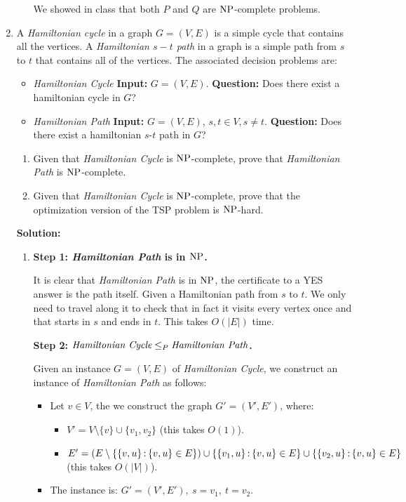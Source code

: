 \begin{enumerate}
\begin{enumerate}
	We showed in class that both $P$ and $Q$ are  $\NP$-complete problems.
	
\end{enumerate}
\newpage

\item A {\em Hamiltonian cycle} in a graph $G = (V,E)$ is a simple cycle that contains all the
vertices. A {\em Hamiltonian $s-t$ path} in a graph is a simple path from $s$ to $t$ that
contains all of the vertices. The associated decision problems are:
\begin{itemize}
	\item {\em Hamiltonian Cycle} {\bf Input:} $G=(V,E)$. {\bf Question:} Does there exist a hamiltonian cycle in $G$?
	\item  {\em Hamiltonian Path} {\bf Input:} $G=(V,E)$, $s,t\in V, s\neq t$. {\bf Question:} Does there exist a hamiltonian $s$-$t$ path in $G$?
\end{itemize}
\begin{enumerate}
	\item  Given that {\em Hamiltonian Cycle} is $\NP$-complete, prove that {\em Hamiltonian Path} is $\NP$-complete.
	\item Given that {\em Hamiltonian Cycle} is $\NP$-complete, prove that the optimization version of the TSP problem is $\NP$-hard. 
\end{enumerate}

{\bf \Large Solution:}\\



\begin{enumerate}
	\item {\bf  Step 1: {\em Hamiltonian Path} is in $\NP$.} 
	
	It is clear that {\em Hamiltonian Path} is in $\NP$, the certificate to a YES answer is the path itself. Given a Hamiltonian path from $s$ to $t$. We only need to travel along it to check that in fact it visits every vertex once and that starts in $s$ and ends in $t$. This takes $O(|E|)$ time. 
	
 {\bf Step 2: $\text{{\em Hamiltonian Cycle}}\leq_P\text{{\em Hamiltonian Path}}$.} 
	
	Given an instance $G=(V,E)$ of {\em Hamiltonian Cycle}, we construct an instance of {\em Hamiltonian Path} as follows:
	\begin{itemize}
		\item Let $v\in V$, the we construct the graph $G'=(V',E')$, where:
		\begin{itemize}
			\item $V'=V\setminus\{v\}\cup\{v_1,v_2\}$ (this takes $O(1)$). 
			\item $E'=\left(E\setminus\{\{v,u\}\tq \{v,u\}\in E\}\right)\cup \{\{v_1,u\}\tq \{v,u\}\in E\}\cup \{\{v_2,u\}\tq \{v,u\}\in E\}$ (this takes $O(|V|)$).
		\end{itemize}
		\item The instance is: $G'=(V',E'),\ s=v_1,\ t=v_2$. 
	\end{itemize}
	

\end{enumerate}
\end{enumerate}
